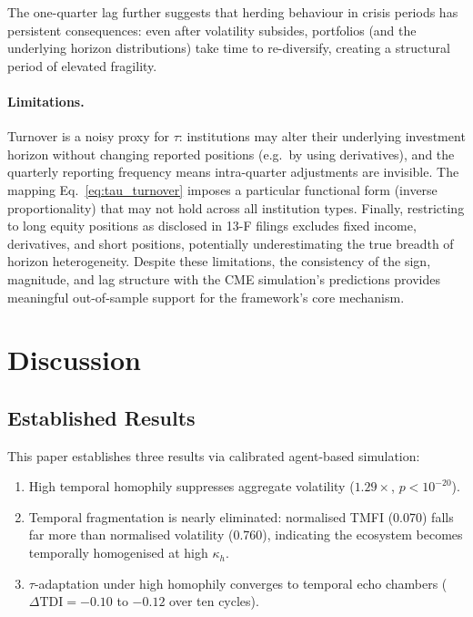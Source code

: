 \documentclass[10pt,twocolumn]{article}
\begin{document}
The one-quarter lag further suggests that herding behaviour in crisis periods
has persistent consequences: even after volatility subsides, portfolios (and
the underlying horizon distributions) take time to re-diversify, creating a
structural period of elevated fragility.

\paragraph{Limitations.}
Turnover is a noisy proxy for $\tau$: institutions may alter their underlying
investment horizon without changing reported positions (e.g.\ by using
derivatives), and the quarterly reporting frequency means intra-quarter
adjustments are invisible.  The mapping Eq.~\eqref{eq:tau_turnover} imposes
a particular functional form (inverse proportionality) that may not hold
across all institution types.  Finally, restricting to long equity positions
as disclosed in 13-F filings excludes fixed income, derivatives, and short
positions, potentially underestimating the true breadth of horizon
heterogeneity.  Despite these limitations, the consistency of the sign,
magnitude, and lag structure with the CME simulation's predictions provides
meaningful out-of-sample support for the framework's core mechanism.

\section{Discussion}
\label{sec:discussion}

\subsection{Established Results}

This paper establishes three results via calibrated agent-based simulation:
\begin{enumerate}
  \item High temporal homophily suppresses aggregate volatility
        ($1.29\times$, $p < 10^{-20}$).
  \item Temporal fragmentation is nearly eliminated: normalised TMFI
        (0.070) falls far more than normalised volatility (0.760),
        indicating the ecosystem becomes temporally homogenised at high
        $\kappa_h$.
  \item $\tau$-adaptation under high homophily converges to temporal echo
        chambers ($\Delta\mathrm{TDI} = {-0.10}$ to ${-0.12}$ over ten
        cycles).
\end{enumerate}
\end{document}

